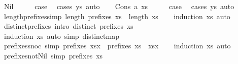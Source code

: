 \begin{isabellebody}
\ Nil\isanewline
\ \ \isamarkupfalse%
\ \isamarkupfalse%
\ {\isacharquery}case\ \isamarkupfalse%
\ {\isacharparenleft}cases\ ys{\isacharparenright}\ auto\isanewline
{}\isamarkupfalse%
\isanewline
\ \ \isamarkupfalse%
\ {\isacharparenleft}Cons\ a\ xs{\isacharparenright}\isanewline
\ \ \isamarkupfalse%
\ \isamarkupfalse%
\ {\isacharquery}case\ \isamarkupfalse%
\ {\isacharparenleft}cases\ ys{\isacharparenright}\ auto\isanewline
{}\isamarkupfalse%
%
\endisatagproof
{\isafoldproof}%
%
\isadelimproof
\isanewline
%
\endisadelimproof
\isanewline
{}\isamarkupfalse%
\ length{\isacharunderscore}prefixes{\isacharbrackleft}simp{\isacharbrackright}{\isacharcolon}\ {\isachardoublequoteopen}length\ {\isacharparenleft}prefixes\ xs{\isacharparenright}\ {\isacharequal}\ length\ xs{\isacharplus}{}{\isachardoublequoteclose}\isanewline
%
\isadelimproof
\ \ %
\endisadelimproof
%
\isatagproof
{}\isamarkupfalse%
\ {\isacharparenleft}induction\ xs{\isacharparenright}\ auto%
\endisatagproof
{\isafoldproof}%
%
\isadelimproof
\isanewline
%
\endisadelimproof
\ \ \ \ \isanewline
{}\isamarkupfalse%
\ distinct{\isacharunderscore}prefixes\ {\isacharbrackleft}intro{\isacharbrackright}{\isacharcolon}\ {\isachardoublequoteopen}distinct\ {\isacharparenleft}prefixes\ xs{\isacharparenright}{\isachardoublequoteclose}\isanewline
%
\isadelimproof
\ \ %
\endisadelimproof
%
\isatagproof
{}\isamarkupfalse%
\ {\isacharparenleft}induction\ xs{\isacharparenright}\ {\isacharparenleft}auto\ simp{\isacharcolon}\ distinct{\isacharunderscore}map{\isacharparenright}%
\endisatagproof
{\isafoldproof}%
%
\isadelimproof
\isanewline
%
\endisadelimproof
\isanewline
{}\isamarkupfalse%
\ prefixes{\isacharunderscore}snoc\ {\isacharbrackleft}simp{\isacharbrackright}{\isacharcolon}\ {\isachardoublequoteopen}prefixes\ {\isacharparenleft}xs{\isacharat}{\isacharbrackleft}x{\isacharbrackright}{\isacharparenright}\ {\isacharequal}\ prefixes\ xs\ {\isacharat}\ {\isacharbrackleft}xs{\isacharat}{\isacharbrackleft}x{\isacharbrackright}{\isacharbrackright}{\isachardoublequoteclose}\isanewline
%
\isadelimproof
\ \ %
\endisadelimproof
%
\isatagproof
{}\isamarkupfalse%
\ {\isacharparenleft}induction\ xs{\isacharparenright}\ auto%
\endisatagproof
{\isafoldproof}%
%
\isadelimproof
\isanewline
%
\endisadelimproof
\isanewline
{}\isamarkupfalse%
\ prefixes{\isacharunderscore}not{\isacharunderscore}Nil\ {\isacharbrackleft}simp{\isacharbrackright}{\isacharcolon}\ {\isachardoublequoteopen}prefixes\ xs\ {\isasymnoteq}\ {\isacharbrackleft}{\isacharbrackright}{\isachardoublequoteclose}\isanewline

\end{isabellebody}
